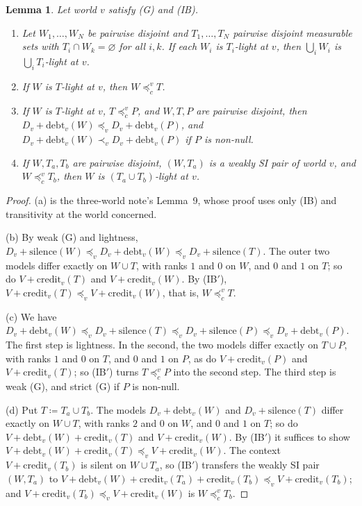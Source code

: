 \documentclass[11pt]{article}
\newtheorem{lemma}[theorem]{Lemma}
\theoremstyle{definition}\newtheorem{definition}[theorem]{Definition}
\theoremstyle{remark}\newtheorem{remark}[theorem]{Remark}
\newcommand{\debt}{\mathrm{debt}}
\newcommand{\cred}{\mathrm{credit}}
\newcommand{\sil}{\mathrm{silence}}
\begin{document}
\begin{lemma}\label{lem:light}
Let world $v$ satisfy (G) and (IB).
\begin{enumerate}[label=(\alph*),leftmargin=*,itemsep=2pt]
\item Let $W_1,\dots,W_N$ be pairwise disjoint and $T_1,\dots,T_N$ pairwise
disjoint measurable sets with $T_i\cap W_k=\varnothing$ for all $i,k$. If
each $W_i$ is $T_i$-light at $v$, then $\bigcup_iW_i$ is
$\bigcup_iT_i$-light at $v$.
\item If $W$ is $T$-light at $v$, then $W\preceq^v_cT$.
\item If $W$ is $T$-light at $v$, $T\preceq^v_cP$, and $W,T,P$ are pairwise
disjoint, then $D_v+\debt_v(W)\preceq_vD_v+\debt_v(P)$, and
$D_v+\debt_v(W)\prec_vD_v+\debt_v(P)$ if $P$ is non-null.
\item If $W,T_a,T_b$ are pairwise disjoint, $(W,T_a)$ is a weakly SI pair of
world $v$, and $W\preceq^v_cT_b$, then $W$ is $(T_a\cup T_b)$-light at $v$.
\end{enumerate}
\end{lemma}
\begin{proof}
(a) is the three-world note's Lemma~9, whose proof uses only (IB) and
transitivity at the world concerned.

(b) By weak (G) and lightness,
$D_v+\sil(W)\preceq_vD_v+\debt_v(W)\preceq_vD_v+\sil(T)$. The outer two
models differ exactly on $W\cup T$, with ranks $1$ and $0$ on $W$, and $0$
and $1$ on $T$; so do $V+\cred_v(T)$ and $V+\cred_v(W)$. By (IB$'$),
$V+\cred_v(T)\preceq_vV+\cred_v(W)$, that is, $W\preceq^v_cT$.

(c) We have $D_v+\debt_v(W)\preceq_vD_v+\sil(T)\preceq_vD_v+\sil(P)
\preceq_vD_v+\debt_v(P)$. The first step is lightness. In the second, the
two models differ exactly on $T\cup P$, with ranks $1$ and $0$ on $T$, and
$0$ and $1$ on $P$, as do $V+\cred_v(P)$ and $V+\cred_v(T)$; so (IB$'$)
turns $T\preceq^v_cP$ into the second step. The third step is weak (G), and
strict (G) if $P$ is non-null.

(d) Put $T\coloneqq T_a\cup T_b$. The models $D_v+\debt_v(W)$ and
$D_v+\sil(T)$ differ exactly on $W\cup T$, with ranks $2$ and $0$ on $W$,
and $0$ and $1$ on $T$; so do $V+\debt_v(W)+\cred_v(T)$ and $V+\cred_v(W)$.
By (IB$'$) it suffices to show
$V+\debt_v(W)+\cred_v(T)\preceq_vV+\cred_v(W)$. The context
$V+\cred_v(T_b)$ is silent on $W\cup T_a$, so (IB$'$) transfers the weakly
SI pair $(W,T_a)$ to
$V+\debt_v(W)+\cred_v(T_a)+\cred_v(T_b)\preceq_vV+\cred_v(T_b)$; and
$V+\cred_v(T_b)\preceq_vV+\cred_v(W)$ is $W\preceq^v_cT_b$.
\end{proof}
\end{document}
